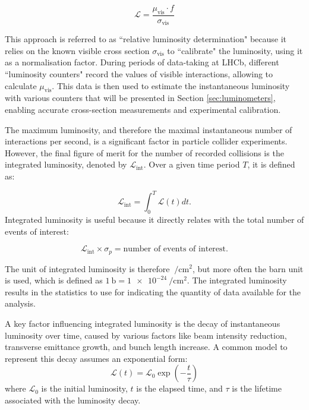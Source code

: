\begin{equation}\label{rel_lumi}
\mathcal{L} = \frac{\mu_{\text{vis}} \cdot f}{\sigma_{\text{vis}}}
\end{equation}

This approach is referred to as ``relative luminosity determination" because it relies on the known visible cross section $\sigma_{\text{vis}}$ to ``calibrate" the luminosity, using it as a normalisation factor. During periods of data-taking at LHCb, different ``luminosity counters" record the values of visible interactions, allowing to calculate $\mu_{\text{vis}}$. This data is then used to estimate the instantaneous luminosity with various counters that will be presented in Section \ref{sec:luminometers}, enabling accurate cross-section measurements and experimental calibration.


The maximum luminosity, and therefore the maximal instantaneous number of interactions per second, is a significant factor in particle collider experiments. However, the final figure of merit for the number of recorded collisions is the integrated luminosity, denoted by $\mathcal{L}_{\text{int}}$. Over a given time period $T$, it is defined as:

\begin{equation}
\mathcal{L}_{\text{int}} = \int_0^T \mathcal{L}(t) dt .
\end{equation}
Integrated luminosity is useful because it directly relates with the total number of events of interest:

\begin{equation}
\mathcal{L}_{\text{int}} \times \sigma_p = \text{number of events of interest}.
\end{equation}

The unit of integrated luminosity is therefore $\SI{}{\per\centi\meter\squared}$, but more often the barn unit is used, which is defined as $\SI{1}{\barn}=\SI{1e-24}{\per\centi\meter\squared}$. The integrated luminosity results in the statistics to use for indicating the quantity of data available for the analysis.

A key factor influencing integrated luminosity is the decay of instantaneous luminosity over time, caused by various factors like beam intensity reduction, transverse emittance growth, and bunch length increase. A common model to represent this decay assumes an exponential form:
\begin{equation}
\mathcal{L}(t) = \mathcal{L}_0 \exp\left( -\frac{t}{\tau} \right)
\end{equation}
where $\mathcal{L}_0$ is the initial luminosity, $t$ is the elapsed time, and $\tau$ is the lifetime associated with the luminosity decay. 

